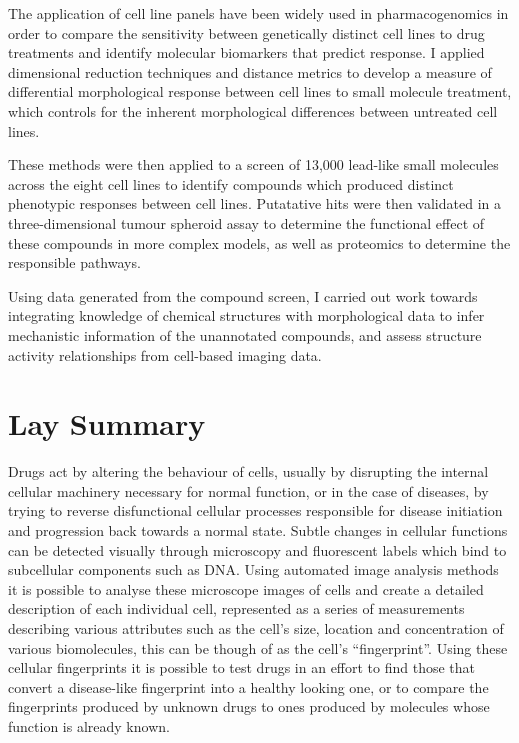 \documentclass[a4paper,11pt,twoside,openright]{scrbook}
\begin{document}
The application of cell line panels have been widely used in pharmacogenomics in order to compare the sensitivity between genetically distinct cell lines to drug treatments and identify molecular biomarkers that predict response.
I applied dimensional reduction techniques and distance metrics to develop a measure of differential morphological response between cell lines to small molecule treatment, which controls for the inherent morphological differences between untreated cell lines.

These methods were then applied to a screen of 13,000 lead-like small molecules across the eight cell lines to identify compounds which produced distinct phenotypic responses between cell lines.
Putatative hits were then validated in a three-dimensional tumour spheroid assay to determine the functional effect of these compounds in more complex models, as well as proteomics to determine the responsible pathways.

Using data generated from the compound screen, I carried out work towards integrating knowledge of chemical structures with morphological data to infer mechanistic information of the unannotated compounds, and assess structure activity relationships from cell-based imaging data.


\chapter*{Lay Summary}
Drugs act by altering the behaviour of cells, usually by disrupting the internal cellular machinery necessary for normal function, or in the case of diseases, by trying to reverse disfunctional cellular processes responsible for disease initiation and progression back towards a normal state.
Subtle changes in cellular functions can be detected visually through microscopy and fluorescent labels which bind to subcellular components such as DNA.
Using automated image analysis methods it is possible to analyse these microscope images of cells and create a detailed description of each individual cell, represented as a series of measurements describing various attributes such as the cell's size, location and concentration of various biomolecules, this can be though of as the cell's ``fingerprint''.
Using these cellular fingerprints it is possible to test drugs in an effort to find those that convert a disease-like fingerprint into a healthy looking one, or to compare the fingerprints produced by unknown drugs to ones produced by molecules whose function is already known.
\end{document}
